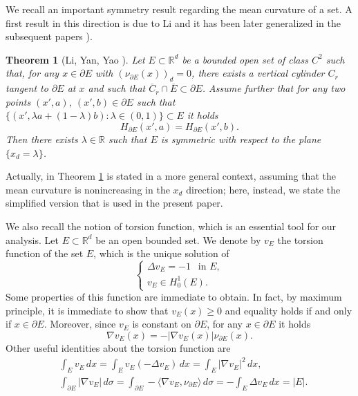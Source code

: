 \documentclass[10pt,reqno,a4paper]{article}
\numberwithin{equation}{section}
\theoremstyle{plain}
\newtheorem{theorem}{Theorem}[section]
\theoremstyle{definition}
\newcommand{\R}{{\mathbb R}}
\newcommand{\la}{\langle}
\newcommand{\ra}{\rangle}
\newcommand{\pa}{\partial}
\newcommand{\grad}{\nabla}
\begin{document}
We recall an important symmetry result regarding the mean curvature of a set.
A first result in this direction is due to Li \cite{Lin} 
and it has been later generalized in the subsequent papers \cite{LN,LN1,LYY}).

\begin{theorem}[Li, Yan, Yao \cite{LYY}]\label{thm:Li}
Let $E \subset \R^d$ be a bounded open set of class $C^2$ 
such that, for any $x \in \pa E$ with $(\nu_{\pa E}(x))_d = 0$, 
there exists a vertical cylinder $C_r$ tangent to $\pa E$ at $x$ 
and such that $\overline C_r \cap \overline{E} \subset \pa E$. 
Assume further that for any two points $(x', a), \ (x',b) \in \pa E$ 
such that $\{(x', \lambda a + (1-\lambda)b ) : \lambda \in (0,1) \} \subset E$ it holds
\[
H_{\pa E}(x',a)= H_{\pa E}(x',b).
\]
Then there exists $\lambda\in \R$ such that $E$ is symmetric 
with respect to the plane $\{x_{d}=\lambda\}$.
\end{theorem}

Actually, in \cite{LYY} Theorem \ref{thm:Li} is stated in a more general context, 
assuming that the mean curvature is nonincreasing in the $x_d$ direction; 
here, instead, we state the simplified version that is used in the present paper. 

We also recall the notion of torsion function, 
which is an essential tool for our analysis. 
Let $E \subset \R^d$  be an  open bounded  set.  
We denote by $v_E$ the torsion function of the set $E$, 
which is the unique solution of %
\[
\begin{cases}
\Delta v_E = -1 \ \ \text{ in } E, 
\\
v_{E} \in H^1_0(E).
\end{cases}
\] 
Some properties of this function are immediate to obtain.
In fact, by maximum principle, it is immediate to show that 
$v_E(x) \geq 0$ and equality holds if and only if $x\in \pa E$. 
Moreover, since $v_E$ is constant on $\pa E$, for any $x \in \pa E$ it holds 
\begin{equation}\label{torsion.gradient}
\nabla v_E(x) = -|\nabla v_E(x)| \nu_{\pa E}(x).
\end{equation}
Other useful identities about the torsion function are
\begin{align}
& \int_E v_E \, dx = \int_E v_E (-\Delta v_E) \, dx 
= \int_E |\grad v_E|^2 \, dx, 
\label{torsion.integral} 
\\ 
& \int_{\pa E} |\nabla v_E| \, d\sigma 
= \int_{\pa E} - \la \grad v_E, \nu_{\pa E} \ra \, d\sigma 
= - \int_E \Delta v_E \, dx 
= |E|. 
\label{torsion.gradient.integral}
\end{align}
\end{document}
